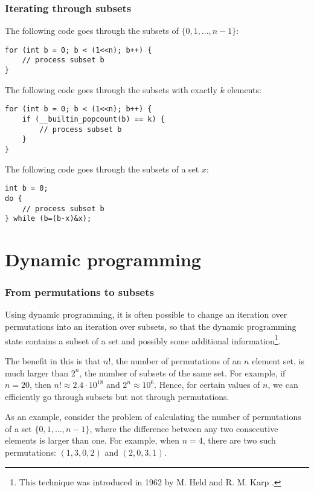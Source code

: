 \subsubsection{Iterating through subsets}

The following code goes through
the subsets of $\{0,1,\ldots,n-1\}$:

\begin{lstlisting}
for (int b = 0; b < (1<<n); b++) {
    // process subset b
}
\end{lstlisting}
The following code goes through
the subsets with exactly $k$ elements:
\begin{lstlisting}
for (int b = 0; b < (1<<n); b++) {
    if (__builtin_popcount(b) == k) {
        // process subset b
    }
}
\end{lstlisting}
The following code goes through the subsets
of a set $x$:
\begin{lstlisting}
int b = 0;
do {
    // process subset b
} while (b=(b-x)&x);
\end{lstlisting}

\section{Dynamic programming}

\subsubsection{From permutations to subsets}

Using dynamic programming, it is often possible
to change an iteration over permutations into
an iteration over subsets, so that
the dynamic programming state
contains a subset of a set and possibly
some additional information\footnote{This technique was introduced in 1962
by M. Held and R. M. Karp \cite{hel62}.}.

The benefit in this is that
$n!$, the number of permutations of an $n$ element set,
is much larger than $2^n$, the number of subsets
of the same set.
For example, if $n=20$, then
$n! \approx 2.4 \cdot 10^{18}$ and $2^n \approx 10^6$.
Hence, for certain values of $n$,
we can efficiently go through subsets but not through permutations.

As an example, consider the problem of
calculating the number of
permutations of a set $\{0,1,\ldots,n-1\}$,
where the difference between any two consecutive
elements is larger than one.
For example, when $n=4$, there are two such permutations:
$(1,3,0,2)$ and $(2,0,3,1)$.


